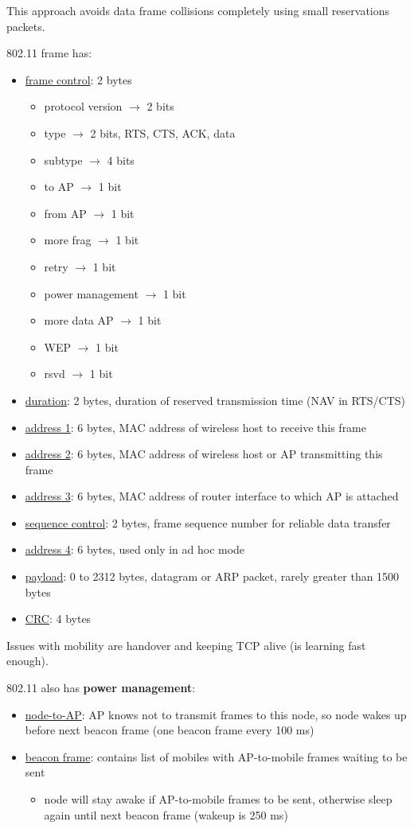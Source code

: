\documentclass[11pt]{article}
\begin{document}
This approach avoids data frame collisions completely using small reservations packets.

802.11 frame has:
\begin{itemize}
\item \uline{frame control}: 2 bytes
\begin{itemize}
\item protocol version \(\to\) 2 bits
\item type \(\to\) 2 bits, RTS, CTS, ACK, data
\item subtype \(\to\) 4 bits
\item to AP \(\to\) 1 bit
\item from AP \(\to\) 1 bit
\item more frag \(\to\) 1 bit
\item retry \(\to\) 1 bit
\item power management \(\to\) 1 bit
\item more data AP \(\to\) 1 bit
\item WEP \(\to\) 1 bit
\item rsvd \(\to\) 1 bit
\end{itemize}
\item \uline{duration}: 2 bytes, duration of reserved transmission time (NAV in RTS/CTS)
\item \uline{address 1}: 6 bytes, MAC address of wireless host to receive this frame
\item \uline{address 2}: 6 bytes, MAC address of wireless host or AP transmitting this frame
\item \uline{address 3}: 6 bytes, MAC address of router interface to which AP is attached
\item \uline{sequence control}: 2 bytes, frame sequence number for reliable data transfer
\item \uline{address 4}: 6 bytes, used only in ad hoc mode
\item \uline{payload}: 0 to 2312 bytes, datagram or ARP packet, rarely greater than 1500 bytes
\item \uline{CRC}: 4 bytes
\end{itemize}

Issues with mobility are handover and keeping TCP alive (is learning fast enough).

802.11 also has \textbf{power management}:
\begin{itemize}
\item \uline{node-to-AP}: AP knows not to transmit frames to this node, so node wakes up before next beacon
frame (one beacon frame every 100 ms)
\item \uline{beacon frame}: contains list of mobiles with AP-to-mobile frames waiting to be sent
\begin{itemize}
\item node will stay awake if AP-to-mobile frames to be sent, otherwise sleep again until next
beacon frame (wakeup is 250 ms)
\end{itemize}
\end{itemize}
\end{document}
